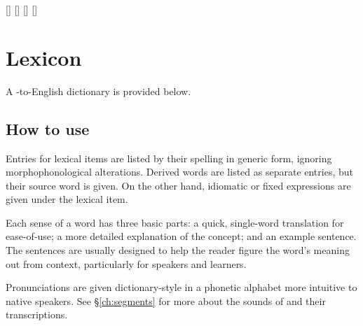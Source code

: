 \makeatletter
{}[]{\def\entry@sound{#1}}
[]{\def\entry@pos{#1}}
[]{\def\entry@etym{#1}}
[]{\def\entry@note{#1}}


\newcommand{\entry}[3][]{%
\begingroup%
\setcounter{sense}{1}%
\setkeys{entry}{#1}%
\par \begin{minipage}{\columnwidth}%
	\textbf{\rzc #2}%
	\ifdefempty{\entry@pos}{}{ • {\footnotesize\it\entry@pos}}%
	\ifdefempty{\entry@sound}{}{ • {\footnotesize\entry@sound}}%
	\ifdefempty{\entry@etym}{}{ ← {\footnotesize\entry@etym}}%
	\ifdefempty{\entry@note}{}{ • {\footnotesize\entry@note}}%
	\ • #3%
\end{minipage}%
\endgroup%
}


\makeatother

\setchapterpreamble[u]{\margintoc}
\chapter{Lexicon}
A \langname{}-to-English dictionary is provided below.

\section*{How to use}
Entries for lexical items are listed by their spelling in generic form, ignoring morphophonological alterations. Derived words are listed as separate entries, but their source word is given. On the other hand, idiomatic or fixed expressions are given under the lexical item.

Each sense of a word has three basic parts: a quick, single-word translation for ease-of-use; a more detailed explanation of the concept; and an example sentence. The sentences are usually designed to help the reader figure the word's meaning out from context, particularly for \langname{} speakers and learners.

Pronunciations are given dictionary-style in a phonetic alphabet more intuitive to native \langname{} speakers. See §\ref{ch:segments} for more about the sounds of \langname{} and their transcriptions.

